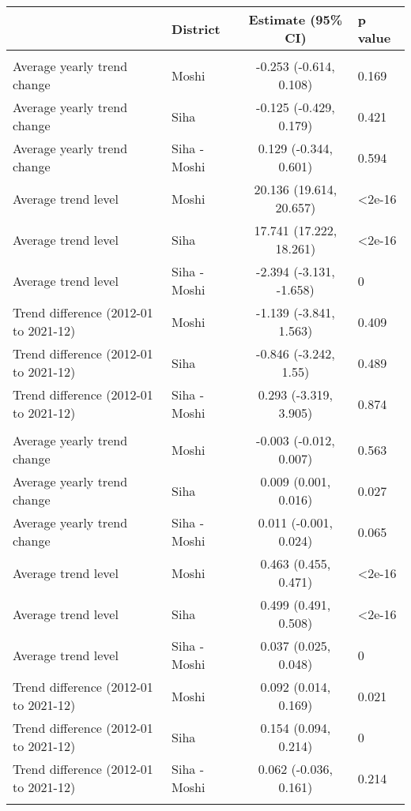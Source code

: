 \begin{longtable}{l|lcl}
\toprule
\multicolumn{1}{l}{} & District & Estimate (95\% CI) & p value \\ 
\midrule\addlinespace[2.5pt]
\multicolumn{4}{l}{PM2.5} \\ 
\midrule\addlinespace[2.5pt]
Average yearly trend change & Moshi & -0.253 (-0.614, 0.108) & 0.169 \\ 
Average yearly trend change & Siha & -0.125 (-0.429, 0.179) & 0.421 \\ 
Average yearly trend change & Siha - Moshi & 0.129 (-0.344, 0.601) & 0.594 \\ 
Average trend level & Moshi & 20.136 (19.614, 20.657) & <2e-16 \\ 
Average trend level & Siha & 17.741 (17.222, 18.261) & <2e-16 \\ 
Average trend level & Siha - Moshi & -2.394 (-3.131, -1.658) & 0 \\ 
Trend difference (2012-01 to 2021-12) & Moshi & -1.139 (-3.841, 1.563) & 0.409 \\ 
Trend difference (2012-01 to 2021-12) & Siha & -0.846 (-3.242, 1.55) & 0.489 \\ 
Trend difference (2012-01 to 2021-12) & Siha - Moshi & 0.293 (-3.319, 3.905) & 0.874 \\ 
\midrule\addlinespace[2.5pt]
\multicolumn{4}{l}{Greenness} \\ 
\midrule\addlinespace[2.5pt]
Average yearly trend change & Moshi & -0.003 (-0.012, 0.007) & 0.563 \\ 
Average yearly trend change & Siha & 0.009 (0.001, 0.016) & 0.027 \\ 
Average yearly trend change & Siha - Moshi & 0.011 (-0.001, 0.024) & 0.065 \\ 
Average trend level & Moshi & 0.463 (0.455, 0.471) & <2e-16 \\ 
Average trend level & Siha & 0.499 (0.491, 0.508) & <2e-16 \\ 
Average trend level & Siha - Moshi & 0.037 (0.025, 0.048) & 0 \\ 
Trend difference (2012-01 to 2021-12) & Moshi & 0.092 (0.014, 0.169) & 0.021 \\ 
Trend difference (2012-01 to 2021-12) & Siha & 0.154 (0.094, 0.214) & 0 \\ 
Trend difference (2012-01 to 2021-12) & Siha - Moshi & 0.062 (-0.036, 0.161) & 0.214 \\ 
\midrule\addlinespace[2.5pt]
\multicolumn{4}{l}{Min. temperature} \\ 

\end{longtable}
